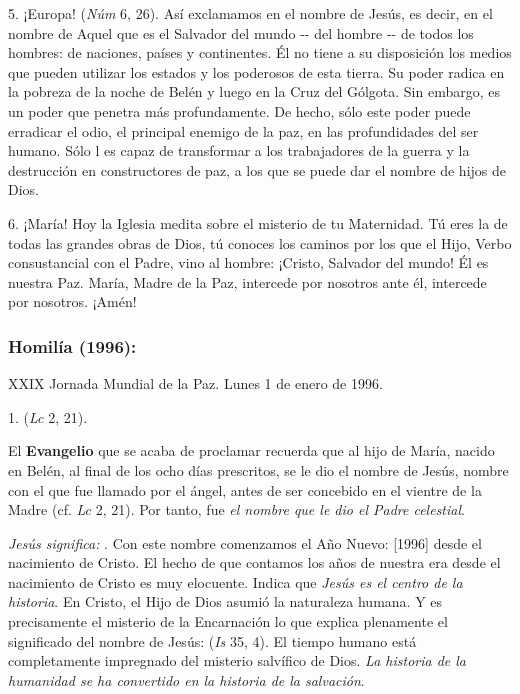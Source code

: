 \begin{body}
	5. ¡Europa!  (\emph{Núm} 6, 26). Así exclamamos en el nombre de Jesús, es decir, en el nombre de Aquel que es el Salvador del mundo -\/- del hombre -\/- de todos los hombres: de naciones, países y continentes. Él no tiene a su disposición los medios que pueden utilizar los estados y los poderosos de esta tierra. Su poder radica en la pobreza de la noche de Belén y luego en la Cruz del Gólgota. Sin embargo, es un poder que penetra más profundamente. De hecho, sólo este poder puede erradicar el odio, el principal enemigo de la paz, en las profundidades del ser humano. Sólo l es capaz de transformar a los trabajadores de la guerra y la destrucción en constructores de paz, a los que se puede dar el nombre de hijos de Dios.
	
	6. ¡María! Hoy la Iglesia medita sobre el misterio de tu Maternidad. Tú eres la  de todas las grandes obras de Dios, tú conoces los caminos por los que el Hijo, Verbo consustancial con el Padre, vino al hombre: ¡Cristo, Salvador del mundo! Él es nuestra Paz. María, Madre de la Paz, intercede por nosotros ante él, intercede por nosotros. ¡Amén!
	
	\subsubsection{Homilía (1996): }
	
	XXIX Jornada Mundial de la Paz. Lunes 1 de enero de 1996.
	
	1.  (\emph{Lc} 2, 21).
	
	El \textbf{Evangelio} que se acaba de proclamar recuerda que al hijo de María, nacido en Belén, al final de los ocho días prescritos, se le dio el nombre de Jesús, nombre con el que fue llamado por el ángel, antes de ser concebido en el vientre de la Madre (cf. \emph{Lc} 2, 21). Por tanto, fue \emph{el nombre que le dio el Padre celestial}.
	
	\emph{Jesús significa: }. Con este nombre comenzamos el Año Nuevo: {[}1996{]} desde el nacimiento de Cristo. El hecho de que contamos los años de nuestra era desde el nacimiento de Cristo es muy elocuente. Indica que \emph{Jesús es el centro de la historia}. En Cristo, el Hijo de Dios asumió la naturaleza humana. Y es precisamente el misterio de la Encarnación lo que explica plenamente el significado del nombre de Jesús:  (\emph{Is} 35, 4). El tiempo humano está completamente impregnado del misterio salvífico de Dios. \emph{La historia de la humanidad se ha convertido en la historia de la salvación}.
	

\end{body}

